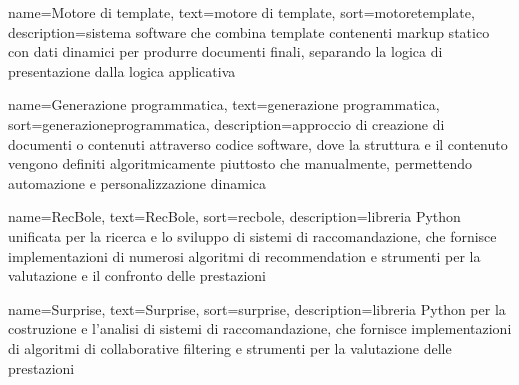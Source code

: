  {
    name=Motore di template,
    text=motore di template,
    sort=motoretemplate,
    description={sistema software che combina template contenenti markup statico con dati dinamici per produrre documenti finali, separando la logica di presentazione dalla logica applicativa}
}

 {
    name=Generazione programmatica,
    text=generazione programmatica,
    sort=generazioneprogrammatica,
    description={approccio di creazione di documenti o contenuti attraverso codice software, dove la struttura e il contenuto vengono definiti algoritmicamente piuttosto che manualmente, permettendo automazione e personalizzazione dinamica}
}

 {
    name=RecBole,
    text=RecBole,
    sort=recbole,
    description={libreria Python unificata per la ricerca e lo sviluppo di sistemi di raccomandazione, che fornisce implementazioni di numerosi algoritmi di recommendation e strumenti per la valutazione e il confronto delle prestazioni}
}

 {
    name=Surprise,
    text=Surprise,
    sort=surprise,
    description={libreria Python per la costruzione e l'analisi di sistemi di raccomandazione, che fornisce implementazioni di algoritmi di collaborative filtering e strumenti per la valutazione delle prestazioni}
}
